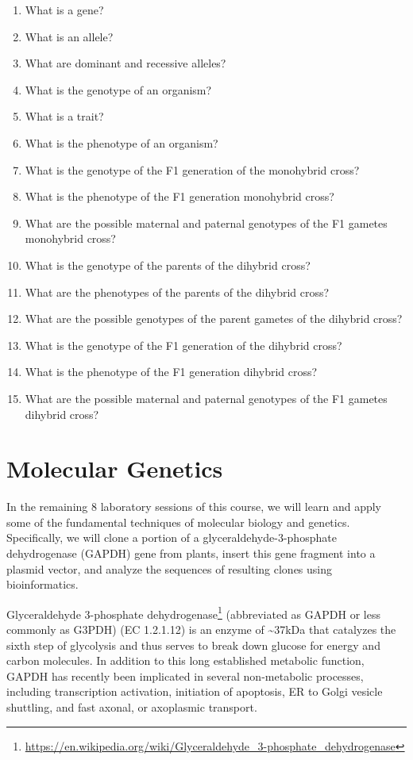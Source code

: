 \documentclass[]{book}
\providecommand{\tightlist}{%
  \setlength{\itemsep}{0pt}\setlength{\parskip}{0pt}}
\let\rmarkdownfootnote\footnote%
\def\footnote{\protect\rmarkdownfootnote}
\renewcommand{\href}[2]{#2\footnote{\url{#1}}}
\theoremstyle{definition}
\theoremstyle{definition}
\theoremstyle{definition}
\theoremstyle{remark}
\begin{document}
\begin{enumerate}
\def\labelenumi{\arabic{enumi}.}
\tightlist
\item
  What is a gene?
\item
  What is an allele?
\item
  What are dominant and recessive alleles?
\item
  What is the genotype of an organism?
\item
  What is a trait?
\item
  What is the phenotype of an organism?
\item
  What is the genotype of the F1 generation of the monohybrid cross?
\item
  What is the phenotype of the F1 generation monohybrid cross?
\item
  What are the possible maternal and paternal genotypes of the F1
  gametes monohybrid cross?
\item
  What is the genotype of the parents of the dihybrid cross?
\item
  What are the phenotypes of the parents of the dihybrid cross?
\item
  What are the possible genotypes of the parent gametes of the dihybrid
  cross?
\item
  What is the genotype of the F1 generation of the dihybrid cross?
\item
  What is the phenotype of the F1 generation dihybrid cross?
\item
  What are the possible maternal and paternal genotypes of the F1
  gametes dihybrid cross?
\end{enumerate}

\chapter*{Molecular Genetics}\label{molecular-genetics}

In the remaining 8 laboratory sessions of this course, we will learn and
apply some of the fundamental techniques of molecular biology and
genetics. Specifically, we will clone a portion of a
glyceraldehyde-3-phosphate dehydrogenase (GAPDH) gene from plants,
insert this gene fragment into a plasmid vector, and analyze the
sequences of resulting clones using bioinformatics.

\href{https://en.wikipedia.org/wiki/Glyceraldehyde_3-phosphate_dehydrogenase}{Glyceraldehyde
3-phosphate dehydrogenase} (abbreviated as GAPDH or less commonly as
G3PDH) (EC 1.2.1.12) is an enzyme of \textasciitilde{}37kDa that
catalyzes the sixth step of glycolysis and thus serves to break down
glucose for energy and carbon molecules. In addition to this long
established metabolic function, GAPDH has recently been implicated in
several non-metabolic processes, including transcription activation,
initiation of apoptosis, ER to Golgi vesicle shuttling, and fast axonal,
or axoplasmic transport.
\end{document}
